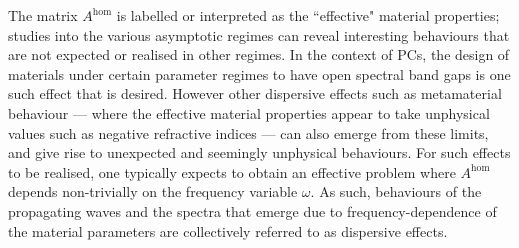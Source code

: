 The matrix $A^{\mathrm{hom}}$ is labelled or interpreted as the ``effective" material properties; studies into the various asymptotic regimes can reveal interesting behaviours that are not expected or realised in other regimes.
In the context of PCs, the design of materials under certain parameter regimes to have open spectral band gaps is one such effect that is desired.
However other dispersive effects such as metamaterial behaviour --- where the effective material properties appear to take unphysical values such as negative refractive indices --- can also emerge from these limits, and give rise to unexpected and seemingly unphysical behaviours.
For such effects to be realised, one typically expects to obtain an effective problem where $A^{\mathrm{hom}}$ depends non-trivially on the frequency variable $\omega$.
As such, behaviours of the propagating waves and the spectra that emerge due to frequency-dependence of the material parameters are collectively referred to as dispersive effects.

